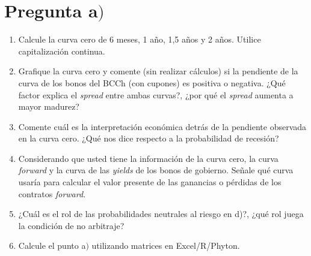 \documentclass{beamer}
\begin{document}
\section{Pregunta a$)$}
  \begin{frame} 
  
\begin{enumerate}[label=\textbf{\alph*)}]
  \footnotesize
  \item Calcule la curva cero de 6 meses, 1 año, 1,5 años y 2 años.
   Utilice capitalización continua.
   \vspace{4pt}
   
   \item Grafique la curva cero y comente (sin realizar cálculos) si 
   la pendiente de la curva de los bonos del BCCh (con cupones) es 
   positiva o negativa. ¿Qué factor explica el \textit{spread} entre 
   ambas curvas?, ¿por qué el \textit{spread} aumenta a mayor madurez?
   \vspace{4pt}
   
   \item Comente cuál es la interpretación económica detrás de la 
   pendiente observada en la curva cero. ¿Qué nos dice respecto a 
   la probabilidad de recesión?
   
   \vspace{4pt}
   \item Considerando que usted tiene la información de la curva cero, 
   la curva \textit{forward} y la curva de las \textit{yields} de los 
   bonos de gobierno. Señale qué curva usaría para calcular el valor 
   presente de las ganancias o pérdidas de los contratos \textit{forward}.
   \vspace{4pt}
   
   \item ¿Cuál es el rol de las probabilidades neutrales al riesgo en d)?, 
   ¿qué rol juega la condición de no arbitraje?
   \vspace{4pt}
  
  \item Calcule el punto a$)$ utilizando matrices en Excel/R/Phyton.
\end{enumerate}

  \end{frame}  
\end{document}
